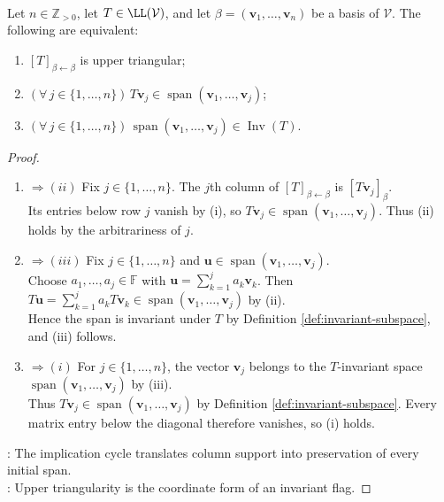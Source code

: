 \begin{theorem} \label{thm:upper-triangular-criteria} \\
Let $n\in\mathbb{Z}_{>0}$, let $T\in\LL(\mathcal{V})$, and let $\beta=(\mathbf{v}_1,\ldots,\mathbf{v}_n)$ be a basis of $\mathcal{V}$. The following are equivalent:
\begin{enumerate}[label=(\roman*)]
\setlength{\itemsep}{0pt}
\item $[T]_{\beta\leftarrow\beta}$ is upper triangular;
\item $(\forall\,j\in\{1,\ldots,n\})\,T\mathbf{v}_j\in\operatorname{span}(\mathbf{v}_1,\ldots,\mathbf{v}_j)$;
\item $(\forall\,j\in\{1,\ldots,n\})\,\operatorname{span}(\mathbf{v}_1,\ldots,\mathbf{v}_j)\in\operatorname{Inv}(T)$.
\end{enumerate}
\begin{proof}
\begin{enumerate}[label=(\roman*)]
\setlength{\itemsep}{0pt}
\item[$(i)$] $\Rightarrow (ii)$ Fix $j\in\{1,\ldots,n\}$. The $j$th column of $[T]_{\beta\leftarrow\beta}$ is $[T\mathbf{v}_j]_{\beta}$.\\
Its entries below row $j$ vanish by (i), so $T\mathbf{v}_j\in\operatorname{span}(\mathbf{v}_1,\ldots,\mathbf{v}_j)$. Thus (ii) holds by the arbitrariness of $j$.
\item[$(ii)$] $\Rightarrow (iii)$ Fix $j\in\{1,\ldots,n\}$ and $\mathbf{u}\in\operatorname{span}(\mathbf{v}_1,\ldots,\mathbf{v}_j)$.\\
Choose $a_1,\ldots,a_j\in\mathbb{F}$ with $\mathbf{u}=\sum\limits_{k=1}^{j}a_k\mathbf{v}_k$. Then $T\mathbf{u}=\sum\limits_{k=1}^{j}a_kT\mathbf{v}_k\in\operatorname{span}(\mathbf{v}_1,\ldots,\mathbf{v}_j)$ by (ii).\\
Hence the span is invariant under $T$ by Definition \ref{def:invariant-subspace}, and (iii) follows.
\item[$(iii)$] $\Rightarrow (i)$ For $j\in\{1,\ldots,n\}$, the vector $\mathbf{v}_j$ belongs to the $T$-invariant space $\operatorname{span}(\mathbf{v}_1,\ldots,\mathbf{v}_j)$ by (iii).\\
Thus $T\mathbf{v}_j\in\operatorname{span}(\mathbf{v}_1,\ldots,\mathbf{v}_j)$ by Definition \ref{def:invariant-subspace}. Every matrix entry below the diagonal therefore vanishes, so (i) holds.
\end{enumerate}
: The implication cycle translates column support into preservation of every initial span.\\
: Upper triangularity is the coordinate form of an invariant flag.
\end{proof}
\end{theorem}

